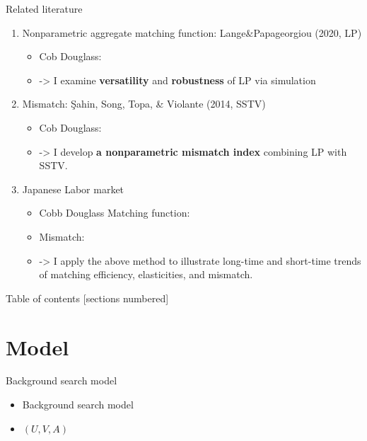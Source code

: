 \documentclass[aspectratio=169]{beamer}
\begin{document}
\begin{frame}{Related literature}
    \begin{enumerate}
        \item Nonparametric aggregate matching function: Lange\&Papageorgiou (2020, LP)
        \begin{itemize}
            \item Cob Douglass:
            \item -> I examine \textbf{versatility} and \textbf{robustness} of LP via simulation
        \end{itemize}
        \item Mismatch: Şahin, Song, Topa, \& Violante (2014, SSTV)
        \begin{itemize}
            \item Cob Douglass: 
            \item -> I develop \textbf{a nonparametric mismatch index} combining LP with SSTV.
        \end{itemize}
        \item Japanese Labor market
        \begin{itemize}
            \item Cobb Douglass Matching function:
            \item Mismatch:
            \item -> I apply the above method to illustrate long-time and short-time trends of matching efficiency, elasticities, and mismatch.
        \end{itemize}
    \end{enumerate}
\end{frame}

\begin{frame}{Table of contents}
  [sections numbered]
  \tableofcontents%
\end{frame}



\section{Model}

\begin{frame}{Background search model}
\begin{itemize}
    \item Background search model
    \item $(U,V,A)$
\end{itemize}
    
\end{frame}
\end{document}
